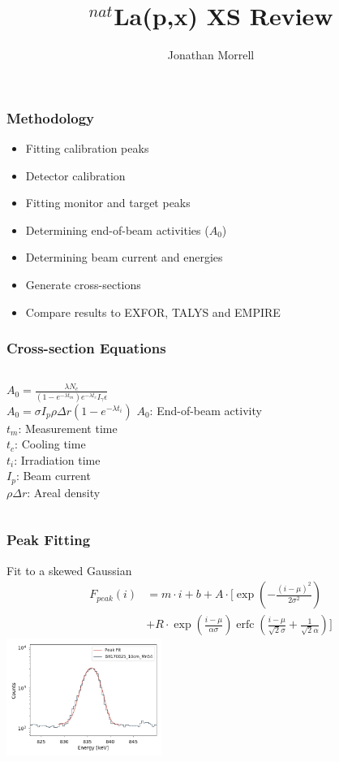 \documentclass[12pt,xcolor=dvipsnames]{beamer}
\author{Jonathan Morrell}
\title{$^{nat}$La(p,x) XS Review}
\DeclareMathOperator\erfc{erfc}
\begin{document}
\begin{frame}
\titlepage
\end{frame}


\begin{frame}
\frametitle{Methodology}
\begin{itemize}
\item Fitting calibration peaks
\item Detector calibration
\item Fitting monitor and target peaks
\item Determining end-of-beam activities ($A_0$)
\item Determining beam current and energies
\item Generate cross-sections
\item Compare results to EXFOR, TALYS and EMPIRE
\end{itemize}
\end{frame}

\begin{frame}
\frametitle{Cross-section Equations}
\begin{columns}[c]
\column{2.5in}
$A_0 = \frac{\lambda N_c}{(1-e^{-\lambda t_m})e^{-\lambda t_c}I_{\gamma}\epsilon}$
\\
$A_0 = \sigma I_p \rho \Delta r (1-e^{-\lambda t_i})$
\column{1.5in}
$A_0$: End-of-beam activity\\
$t_m$: Measurement time\\
$t_c$: Cooling time\\
$t_i$: Irradiation time\\
$I_p$: Beam current\\
$\rho \Delta r$: Areal density\\
\end{columns}
\end{frame}

\begin{frame}
\frametitle{Peak Fitting}
Fit to a skewed Gaussian
\begin{align*}
F_{peak}(i) &= m\cdot i + b + A\cdot [\exp (-\frac{(i-\mu)^2}{2\sigma^2}) \\
& + R\cdot \exp (\frac{i-\mu}{\alpha \sigma}) \erfc (\frac{i-\mu}{\sqrt{2}\sigma}+\frac{1}{\sqrt{2}\alpha})]
\label{eq:peak}
\end{align*}
\centering
\includegraphics[width=2.0in]{Mn_Peak.png}
\end{frame}
\end{document}
